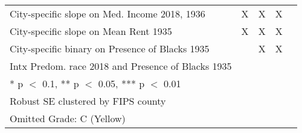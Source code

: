 \begin{table}
{\begin{tabular}[t]{lccc>{}c}
City-specific slope on Med. Income 2018, 1936 & X & X & X & \cellcolor{blue}{\textcolor{white}{X}}\\
City-specific slope on Mean Rent 1935 & X & X & X & \cellcolor{blue}{\textcolor{white}{X}}\\
City-specific binary on Presence of Blacks 1935 &  & X & X & \cellcolor{blue}{\textcolor{white}{X}}\\
Intx Predom. race 2018 and Presence of Blacks 1935 &  &  &  & \cellcolor{blue}{\textcolor{white}{X}}\\
\bottomrule
\multicolumn{5}{l}{\textsuperscript{} * p $<$ 0.1, ** p $<$ 0.05, *** p $<$ 0.01}\\
\multicolumn{5}{l}{\textsuperscript{} Robust SE clustered by FIPS county}\\
\multicolumn{5}{l}{\textsuperscript{} Omitted Grade: C (Yellow)}\\
\end{tabular}}
\end{table}
